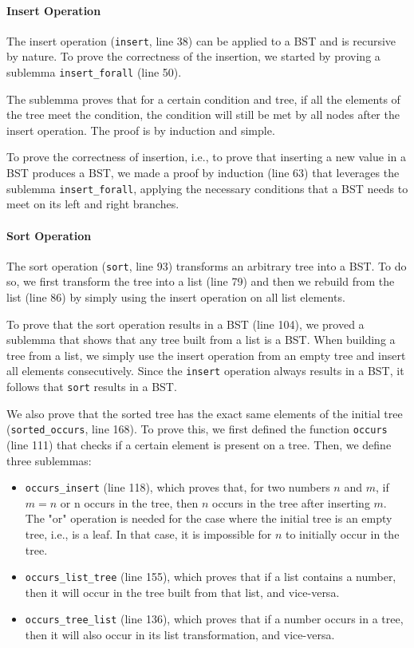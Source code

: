 \documentclass[a4paper]{article}
\begin{document}
\paragraph{Insert Operation}

The insert operation (\texttt{insert}, line 38) can be applied to a BST and is recursive by nature. To prove the correctness of the insertion, we started by proving a sublemma \texttt{insert\_forall} (line 50).

The sublemma proves that for a certain condition and tree, if all the elements of the tree meet the condition, the condition will still be met by all nodes after the insert operation. The proof is by induction and simple.

To prove the correctness of insertion, i.e., to prove that inserting a new value in a BST produces a BST, we made a proof by induction (line 63) that leverages the sublemma \texttt{insert\_forall}, applying the necessary conditions that a BST needs to meet on its left and right branches.

\paragraph{Sort Operation}

The sort operation (\texttt{sort}, line 93) transforms an arbitrary tree into a BST. To do so, we first transform the tree into a list (line 79) and then we rebuild from the list (line 86) by simply using the insert operation on all list elements.

To prove that the sort operation results in a BST (line 104), we proved a sublemma that shows that any tree built from a list is a BST. When building a tree from a list, we simply use the insert operation from an empty tree and insert all elements consecutively. Since the \texttt{insert} operation always results in a BST, it follows that \texttt{sort} results in a BST.

We also prove that the sorted tree has the exact same elements of the initial tree (\texttt{sorted\_occurs}, line 168). To prove this, we first defined the function \texttt{occurs} (line 111) that checks if a certain element is present on a tree. Then, we define three sublemmas:

\begin{itemize}
    \item \texttt{occurs\_insert} (line 118), which proves that, for two numbers $n$ and $m$, if $m=n$ or n occurs in the tree, then $n$ occurs in the tree after inserting $m$. The "or" operation is needed for the case where the initial tree is an empty tree, i.e., is a leaf. In that case, it is impossible for $n$ to initially occur in the tree.
    \item \texttt{occurs\_list\_tree} (line 155), which proves that if a list contains a number, then it will occur in the tree built from that list, and vice-versa.
    \item \texttt{occurs\_tree\_list} (line 136), which proves that if a number occurs in a tree, then it will also occur in its list transformation, and vice-versa.
\end{itemize}
\end{document}

